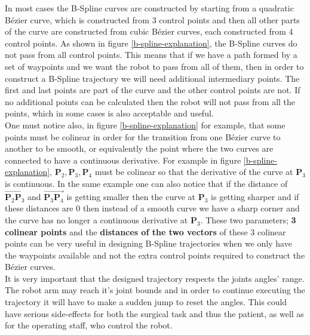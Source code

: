 In most cases the B-Spline curves are constructed by starting from a quadratic B\'ezier curve, which is constructed from 3 control points and then all other 
parts of the curve are constructed from cubic B\'ezier curves, each constructed from 4 control points. As shown in figure \ref{b-spline-explanation}, the B-Spline 
curves do not pass from all control points. This means that if we have a path formed by a set of waypoints and we want the robot to pass from all of them, then 
in order to construct a B-Spline trajectory we will need additional intermediary points. The first and last points are part of the curve and the other control 
points are not. If no additional points can be calculated then the robot will not pass from all the points, which in some cases is also acceptable and useful. \\

One must notice also, in figure \ref{b-spline-explanation} for example, that some points must be colinear in order for the transition from one B\'ezier curve to another to be smooth, or equivalently 
the point where the two curves are connected to have a continuous derivative. For example in figure \ref{b-spline-explanation}, $\mathbf{P}_2, \mathbf{P}_3, \mathbf{P}_4$ must be colinear so that the 
derivative of the curve at $\mathbf{P}_3$ is continuous. In the same example one can also notice that if the distance of $\overrightarrow{\mathbf{P}_2\mathbf{P}_3}$ and $\overrightarrow{\mathbf{P}_3\mathbf{P}_4}$ 
is getting smaller then the curve at $\mathbf{P}_3$ is getting sharper and if these distances are $0$ then instead of a smooth curve we have a sharp corner and the curve has 
no longer a continuous derivative at $\mathbf{P}_3$. These two parameters; \textbf{3 colinear points} and the \textbf{distances of the two vectors} of these 3 colinear points can be very useful in designing 
B-Spline trajectories when we only have the waypoints available and not the extra control points required to construct the B\'ezier curves.\\

It is very important that the designed trajectory respects the joints angles' range. The robot arm may reach it's joint bounds and in order to 
continue executing the trajectory it will have to make a sudden jump to reset the angles. 
This could have serious side-effects for both the surgical task and thus the patient, as well as 
for the operating staff, who control the robot.

